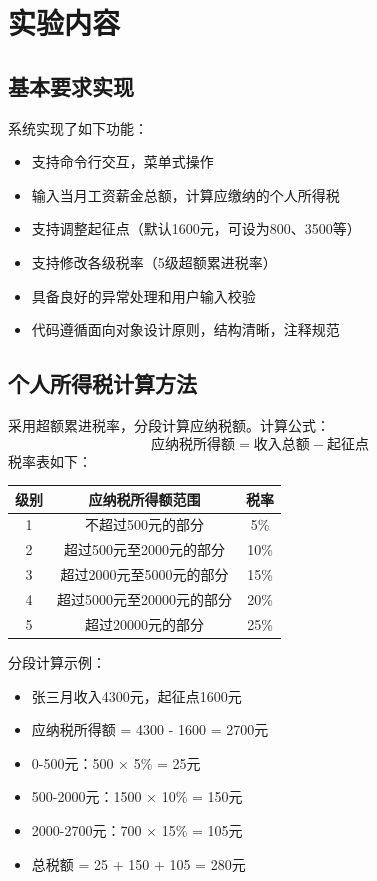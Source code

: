 \chapter{实验内容}
\section{基本要求实现}
系统实现了如下功能：
\begin{itemize}
	\item 支持命令行交互，菜单式操作
	\item 输入当月工资薪金总额，计算应缴纳的个人所得税
	\item 支持调整起征点（默认1600元，可设为800、3500等）
	\item 支持修改各级税率（5级超额累进税率）
	\item 具备良好的异常处理和用户输入校验
	\item 代码遵循面向对象设计原则，结构清晰，注释规范
\end{itemize}

\section{个人所得税计算方法}
采用超额累进税率，分段计算应纳税额。计算公式：
\begin{equation*}
	\text{应纳税所得额} = \text{收入总额} - \text{起征点}
\end{equation*}
税率表如下：
\begin{center}
\begin{tabular}{|c|c|c|}
\hline
级别 & 应纳税所得额范围 & 税率 \\
\hline
1 & 不超过500元的部分 & 5\% \\
2 & 超过500元至2000元的部分 & 10\% \\
3 & 超过2000元至5000元的部分 & 15\% \\
4 & 超过5000元至20000元的部分 & 20\% \\
5 & 超过20000元的部分 & 25\% \\
\hline
\end{tabular}
\end{center}
分段计算示例：
\begin{itemize}
	\item 张三月收入4300元，起征点1600元
	\item 应纳税所得额 = 4300 - 1600 = 2700元
	\item 0-500元：500 × 5\% = 25元
	\item 500-2000元：1500 × 10\% = 150元
	\item 2000-2700元：700 × 15\% = 105元
	\item 总税额 = 25 + 150 + 105 = 280元
\end{itemize}

